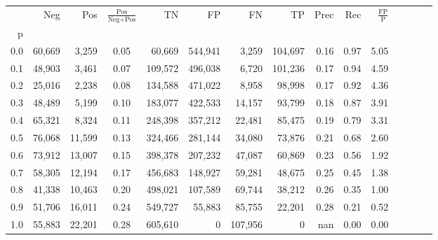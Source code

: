 \begin{tabular}{rrrcrrrrrrrrrrr}
\toprule
{} &     Neg &     Pos & $\frac{\text{Pos}}{\text{Neg}+\text{Pos}}$ &       TN &       FP &       FN &       TP &  Prec &   Rec & $\frac{\text{FP}}{\text{P}}$ \\
p   &         &         &                                            &          &          &          &          &       &       &                              \\
\midrule
0.0 &  60,669 &   3,259 &                                       0.05 &   60,669 &  544,941 &    3,259 &  104,697 &  0.16 &  0.97 &                         5.05 \\
0.1 &  48,903 &   3,461 &                                       0.07 &  109,572 &  496,038 &    6,720 &  101,236 &  0.17 &  0.94 &                         4.59 \\
0.2 &  25,016 &   2,238 &                                       0.08 &  134,588 &  471,022 &    8,958 &   98,998 &  0.17 &  0.92 &                         4.36 \\
0.3 &  48,489 &   5,199 &                                       0.10 &  183,077 &  422,533 &   14,157 &   93,799 &  0.18 &  0.87 &                         3.91 \\
0.4 &  65,321 &   8,324 &                                       0.11 &  248,398 &  357,212 &   22,481 &   85,475 &  0.19 &  0.79 &                         3.31 \\
0.5 &  76,068 &  11,599 &                                       0.13 &  324,466 &  281,144 &   34,080 &   73,876 &  0.21 &  0.68 &                         2.60 \\
0.6 &  73,912 &  13,007 &                                       0.15 &  398,378 &  207,232 &   47,087 &   60,869 &  0.23 &  0.56 &                         1.92 \\
0.7 &  58,305 &  12,194 &                                       0.17 &  456,683 &  148,927 &   59,281 &   48,675 &  0.25 &  0.45 &                         1.38 \\
0.8 &  41,338 &  10,463 &                                       0.20 &  498,021 &  107,589 &   69,744 &   38,212 &  0.26 &  0.35 &                         1.00 \\
0.9 &  51,706 &  16,011 &                                       0.24 &  549,727 &   55,883 &   85,755 &   22,201 &  0.28 &  0.21 &                         0.52 \\
1.0 &  55,883 &  22,201 &                                       0.28 &  605,610 &        0 &  107,956 &        0 &   nan &  0.00 &                         0.00 \\
\bottomrule
\end{tabular}
